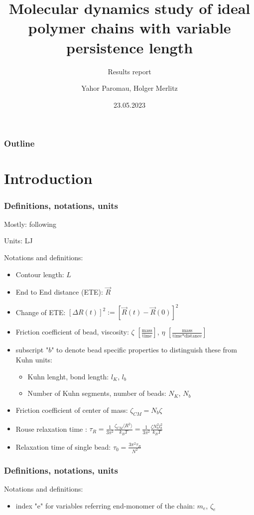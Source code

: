 \documentclass[handout]{beamer}
\title{Molecular dynamics study of ideal polymer chains with variable persistence length}
\subtitle{Results report}
\author{Yahor Paromau, Holger Merlitz}
\institute{ITP@IPF}
\date{23.05.2023}
\newcommand{\mean}[1]{\langle #1 \rangle}
\begin{document}
\begin{frame}
    \titlepage
\end{frame}


\begin{frame}
    \frametitle{Outline}
    \tableofcontents
\end{frame}

\section{Introduction}

\begin{frame}
    \frametitle{Definitions, notations, units}
    Mostly: following \cite{svaneborg_2020}

    Units: LJ

    Notations and definitions:

    \begin{itemize}
        \item Contour length: $L$
        \item End to End distance (ETE): $\vec{R}$
        \item Change of ETE: $[\Delta R(t)]^2 := [\vec{R}(t)-\vec{R}(0)]^2$
        \item Friction coefficient of bead, viscosity: $\zeta$ $[\frac{\textrm{mass}}{\textrm{time}}]$, $\eta$ $[\frac{\textrm{mass}}{\textrm{time} * \textrm{distance}}]$
        \item subscript "$b$" to denote bead speciﬁc properties to distinguish these from Kuhn units:
            \begin{itemize}
                \item Kuhn lenght, bond length: $l_K$, $l_b$
                \item Number of Kuhn segments, number of beads: $N_K$, $N_b$
            \end{itemize}
        \item Friction coefficient of center of mass: $\zeta_{CM}=N_b \zeta$ 
        \item Rouse relaxation time \cite{svaneborg_2020}: $\tau_R = \frac{1}{3 \pi^2} \frac{\zeta_{CM} \mean{R^2}}{k_B T} = \frac{1}{3 \pi^2} \frac{\zeta N_b^2 l_b^2}{k_B T}$
        \item Relaxation time of single bead: $\tau_0 = \frac{3\pi^2 \tau_R}{N^2}$ 
    \end{itemize}

\end{frame}

\begin{frame}
    \frametitle{Definitions, notations, units}

    Notations and definitions:

    \begin{itemize}
        \item index "e" for variables referring end-monomer of the chain: $m_e$, $\zeta_e$ 
    \end{itemize}

\end{frame}
    
\end{document}
